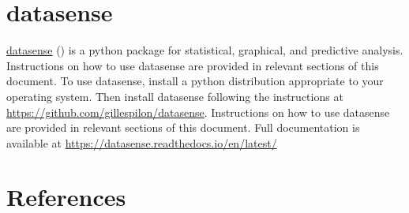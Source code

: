 \documentclass[10pt, letterpaper, twoside]{article}
\begin{document}
\section{datasense}\label{sec:datasense}
\href{https://github.com/gillespilon/datasense}{datasense} (\cite{datasense}) is a \Gls{python} package for statistical, graphical, and predictive analysis. Instructions on how to use datasense are provided in relevant sections of this document. To use datasense, install a \Gls{python} distribution appropriate to your operating system. Then install datasense following the instructions  at \href{https://github.com/gillespilon/datasense}{https://github.com/gillespilon/datasense}.
Instructions on how to use datasense are provided in relevant sections of this document.
Full documentation is available at \href{https://datasense.readthedocs.io/en/latest/}{https://datasense.readthedocs.io/en/latest/}
\newpage
\printunsrtglossary[type={abbreviations}]
\newpage
\printunsrtglossary[style={indexgroup}]
\newpage
\section{References}\label{sec:references}
\printbibliography[heading=none]
\end{document}
